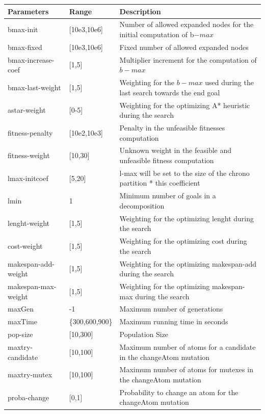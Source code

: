 \documentclass[a4paper,10pt]{article}
\begin{document}
\begin{table}
\scriptsize
\begin{tabular}{|l|l|l|}
\hline
Parameters 	&	   Range 	&	Description\\					
\hline									
bmax-init 	&	[10e3,10e6]	&	 Number of allowed expanded nodes for the initial computation of b${-max}$\\					
bmax-fixed	&	[10e3,10e6]	&	 Fixed number of allowed expanded nodes\\					
bmax-increase-coef	&	[1,5]	&	Multiplier increment for the computation of $b-{max}$\\					
bmax-last-weight 	&	[1,5]	&	 Weighting for the $b-{max}$ used during the last search towards the end goal\\					
astar-weight 	&	[0-5]	&	  Weighting for the optimizing  A* heuristic during the search\\					
fitness-penalty 	&	[10e2,10e3]	&	 Penalty in the unfeasible fitnesses computation\\					
fitness-weight 	&	[10,30]	&	 Unknown weight in the feasible and unfeasible fitness computation\\					
lmax-initcoef 	&	[5,20]	&	 l-max will be set to the size of the chrono partition * this coefficient\\					
lmin 	&	1	&	 Minimum number of goals in a decomposition\\					
lenght-weight	&	[1,5]	&	 Weighting for the optimizing lenght during the search\\					
cost-weight 	&	[1,5]	&	  Weighting for the optimizing cost during the search\\					
makespan-add-weight 	&	[1,5]	&	Weighting for the optimizing  makespan-add during the search  \\					
makespan-max-weight 	&	[1,5]	&	 Weighting for the optimizing makespan-max during the search\\					
maxGen	&	-1	&	 Maximum number of generations\\	
maxTime	&  \{300,600,900\}	& Maximum running time in seconds\\						
pop-size 	&	[10,300]	&	 Population Size\\					
maxtry-candidate	&	[10,100]	&	  Maximum number of atoms for a candidate in the changeAtom mutation\\					
maxtry-mutex	&	[10,100]	&	 Maximum number of atoms  for mutexes in the changeAtom mutation\\					
proba-change	&	[0,1]	&	  Probability to change an atom for the changeAtom mutation\\					

\end{tabular}
\end{table}
\end{document}
